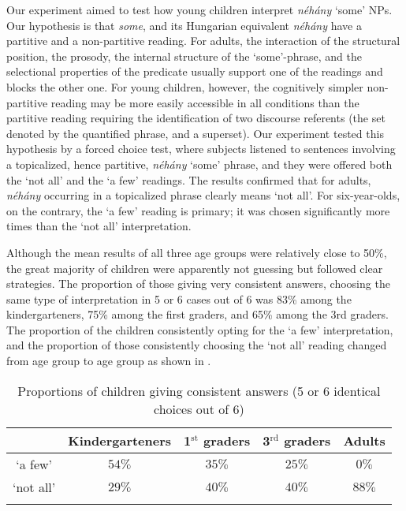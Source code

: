 \documentclass[output=paper]{langscibook}
\begin{document}
Our experiment aimed to test how young children interpret \textit{néhány} `some' NPs. Our hypothesis is that \textit{some}, and its Hungarian equivalent \textit{néhány} have a partitive and a non-partitive reading. For adults, the interaction of the structural position, the prosody, the internal structure of the `some'-phrase, and the selectional properties of the predicate usually support one of the readings and blocks the other one. For young children, however, the cognitively simpler non-partitive reading may be more easily accessible in all conditions than the partitive reading requiring the identification of two discourse referents (the set denoted by the quantified phrase, and a superset).	Our experiment tested this hypothesis by a forced choice test, where subjects listened to sentences involving a topicalized, hence partitive, \textit{néhány} `some' phrase, and they were offered both the `not all' and the `a few' readings. The results confirmed that for adults, \textit{néhány} occurring in a topicalized phrase clearly means `not all'. For six-year-olds, on the contrary, the `a few' reading is primary; it was chosen significantly more times than the `not all' interpretation. 

Although the mean results of all three age groups were relatively close to 50\%, the great majority of children were apparently not guessing but followed clear strategies. The proportion of those giving very consistent answers, choosing the same type of interpretation in 5 or 6 cases out of 6 was 83\% among the kindergarteners, 75\% among the first graders, and 65\% among the 3rd graders. The proportion of the children consistently opting for the `a few' interpretation, and the proportion of those consistently choosing the `not all' reading changed from age group to age group as shown in .

\begin{table}
\centering
\begin{tabular}{c c c c c} 
\lsptoprule
 {} & Kindergarteners & 1$^\text{st}$ graders & 3$^\text{rd}$ graders & Adults \\
\midrule
`a few' & $54\%$ & $35\%$ & $25\%$ & $0\%$ \\
`not all' & $29\%$ & $40\%$ & $40\%$ & $88\%$ \\
\lspbottomrule
\end{tabular}
\caption{Proportions of children giving consistent answers (5 or 6 identical choices out of 6)}
\label{kis-zet:table:1}
\end{table}
\end{document}
